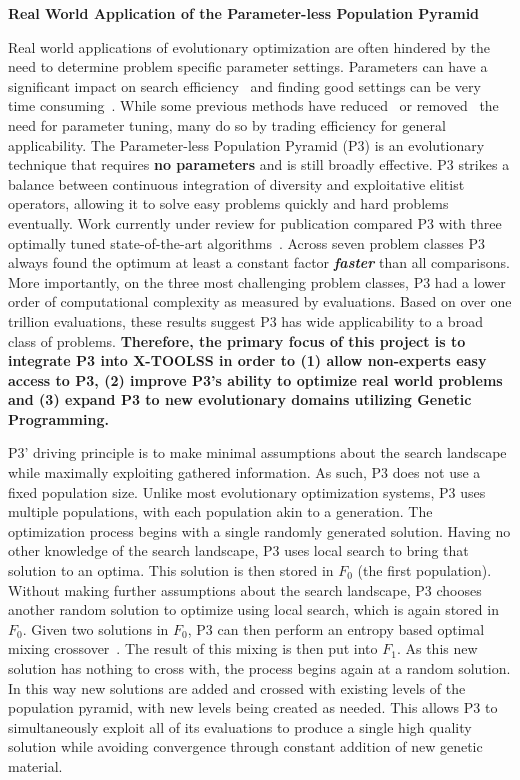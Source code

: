 \documentclass{article}
\begin{document}
\begin{center}
\textbf{Real World Application of the Parameter-less Population Pyramid}
\end{center}

Real world applications of evolutionary optimization are often
hindered by the need to determine problem specific parameter
settings.  
Parameters can have a significant impact on search efficiency~\cite{goldberg:1991:gasize}
and finding good settings can be very time consuming~\cite{grefenstette:1986:optimalga}.
While some previous methods have reduced~\cite{Back:1992:selfadapt}
or removed~\cite{pelikan:2004:parameterlesshboa} the
need for parameter tuning, many do so by trading efficiency for
general applicability.  The Parameter-less Population Pyramid (P3)
is an evolutionary technique that requires \textbf{no parameters}
and is still broadly effective. P3 strikes a balance between
continuous integration of diversity and exploitative elitist
operators, allowing it to solve easy problems quickly and hard
problems eventually.  Work currently under review for publication
compared P3 with three optimally tuned state-of-the-art algorithms~\cite{thierens:2013:ltgahiff,doerr:2013:lambdalambda}.
Across seven problem classes P3 always found the
optimum at least a constant factor \emph{\textbf{faster}} than all comparisons.
More importantly, on the three most challenging problem classes,
P3 had a lower order of computational complexity as measured by
evaluations.  Based on over one trillion evaluations, these results
suggest P3 has wide applicability to a broad class of
problems.  \textbf{Therefore, the primary focus of this project is to integrate
P3 into X-TOOLSS in order to (1) allow non-experts easy access to P3,
(2) improve P3's ability to optimize real world problems and (3) expand
P3 to new evolutionary domains utilizing Genetic Programming.}

P3' driving principle is to make
minimal assumptions about the search landscape while maximally
exploiting gathered information.  As such, P3 does not use a fixed
population size.  Unlike most evolutionary optimization systems, P3 uses multiple
populations, with each population akin to a generation. 
The optimization process begins with a single randomly generated solution.
Having no other knowledge of the search landscape, P3 uses local search
to bring that solution to an optima.  This solution is then stored in $F_0$
(the first population).  Without making further assumptions
about the search landscape, P3 chooses another random solution to optimize using
local search, which is again stored in $F_0$.  Given two solutions in $F_0$, P3 can then
perform an entropy based optimal mixing crossover~\cite{bosman:2011:lsbbo}.  The
result of this mixing is then put into $F_1$.  As this new solution has nothing
to cross with, the process begins again at a random solution.  In this way new
solutions are added and crossed with existing levels of the population pyramid,
with new levels being created as needed.  This allows P3 to simultaneously exploit
all of its evaluations to produce a single high quality solution while avoiding convergence through
constant addition of new genetic material.
\end{document}
